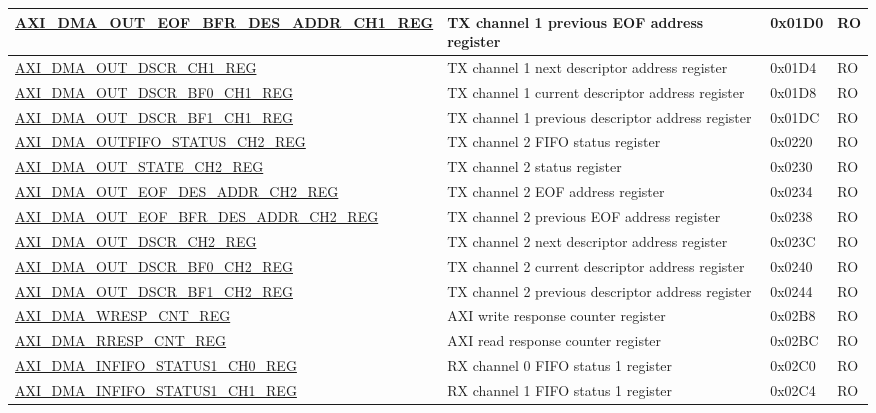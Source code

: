 \begin{longtable}{ | l | p{10cm} | p{1.3cm} | l | }
\hyperref[regdesc:AXIDMAOUTEOFBFRDESADDRCHNREG]{AXI\_DMA\_OUT\_EOF\_BFR\_DES\_ADDR\_CH1\_REG} & TX channel 1 previous EOF address register & 0x01D0 & RO \\ \hline
\hyperref[regdesc:AXIDMAOUTDSCRCHNREG]{AXI\_DMA\_OUT\_DSCR\_CH1\_REG} & TX channel 1 next descriptor address register & 0x01D4 & RO \\ \hline
\hyperref[regdesc:AXIDMAOUTDSCRBF0CHNREG]{AXI\_DMA\_OUT\_DSCR\_BF0\_CH1\_REG} & TX channel 1 current descriptor address register & 0x01D8 & RO \\ \hline
\hyperref[regdesc:AXIDMAOUTDSCRBF1CHNREG]{AXI\_DMA\_OUT\_DSCR\_BF1\_CH1\_REG} & TX channel 1 previous descriptor address register & 0x01DC & RO \\ \hline
\hyperref[regdesc:AXIDMAOUTFIFOSTATUSCHNREG]{AXI\_DMA\_OUTFIFO\_STATUS\_CH2\_REG} & TX channel 2 FIFO status register & 0x0220 & RO \\ \hline
\hyperref[regdesc:AXIDMAOUTSTATECHNREG]{AXI\_DMA\_OUT\_STATE\_CH2\_REG} & TX channel 2 status register & 0x0230 & RO \\ \hline
\hyperref[regdesc:AXIDMAOUTEOFDESADDRCHNREG]{AXI\_DMA\_OUT\_EOF\_DES\_ADDR\_CH2\_REG} & TX channel 2 EOF address register & 0x0234 & RO \\ \hline
\hyperref[regdesc:AXIDMAOUTEOFBFRDESADDRCHNREG]{AXI\_DMA\_OUT\_EOF\_BFR\_DES\_ADDR\_CH2\_REG} & TX channel 2 previous EOF address register & 0x0238 & RO \\ \hline
\hyperref[regdesc:AXIDMAOUTDSCRCHNREG]{AXI\_DMA\_OUT\_DSCR\_CH2\_REG} & TX channel 2 next descriptor address register & 0x023C & RO \\ \hline
\hyperref[regdesc:AXIDMAOUTDSCRBF0CHNREG]{AXI\_DMA\_OUT\_DSCR\_BF0\_CH2\_REG} & TX channel 2 current descriptor address register & 0x0240 & RO \\ \hline
\hyperref[regdesc:AXIDMAOUTDSCRBF1CHNREG]{AXI\_DMA\_OUT\_DSCR\_BF1\_CH2\_REG} & TX channel 2 previous descriptor address register & 0x0244 & RO \\ \hline
\hyperref[regdesc:AXIDMAWRESPCNTREG]{AXI\_DMA\_WRESP\_CNT\_REG} & AXI write response counter register & 0x02B8 & RO \\ \hline
\hyperref[regdesc:AXIDMARRESPCNTREG]{AXI\_DMA\_RRESP\_CNT\_REG} & AXI read response counter register & 0x02BC & RO \\ \hline
\hyperref[regdesc:AXIDMAINFIFOSTATUS1CHNREG]{AXI\_DMA\_INFIFO\_STATUS1\_CH0\_REG} & RX channel 0 FIFO status 1 register & 0x02C0 & RO \\ \hline
\hyperref[regdesc:AXIDMAINFIFOSTATUS1CHNREG]{AXI\_DMA\_INFIFO\_STATUS1\_CH1\_REG} & RX channel 1 FIFO status 1 register & 0x02C4 & RO \\ \hline

\end{longtable}

